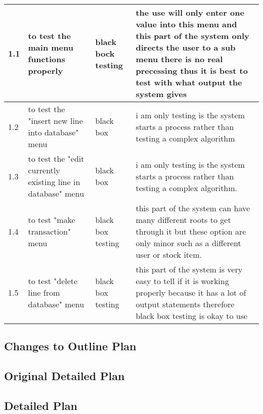 \begin{landscape}
\begin{center}
\begin{tabular}{|p{2cm}|p{5cm}|p{5cm}|p{4cm}|}
        1.1 & to test the main menu functions properly  & black bock testing & the use will only enter one value into this menu and this part of the system only directs the user to a sub menu there is no real precessing thus it is best to test with what output the system gives \\ \hline
1.2 &to test the "insert new line into database" menu & black box & i am only testing is the system starts a process rather than testing a complex algorithm\\ \hline
1.3 & to test the "edit currently existing line in database" menu & black box &  i am only testing is the system starts a process rather than testing a complex algorithm. \\ \hline
1.4 & to test "make transaction" menu & black box testing & this part of the system can have many different roots to get through it but these option are only minor such as a different user or stock item. \\ \hline
1.5 & to test "delete line from database" menu & black box testing & this part of the system is very easy to tell if it is working properly because it has a lot of output statements therefore black box testing is okay to use \\ \hline
    \end{tabular}
\end{center}

\subsection{Changes to Outline Plan}

\subsection{Original Detailed Plan}

\subsection{Detailed Plan}


\end{landscape}
